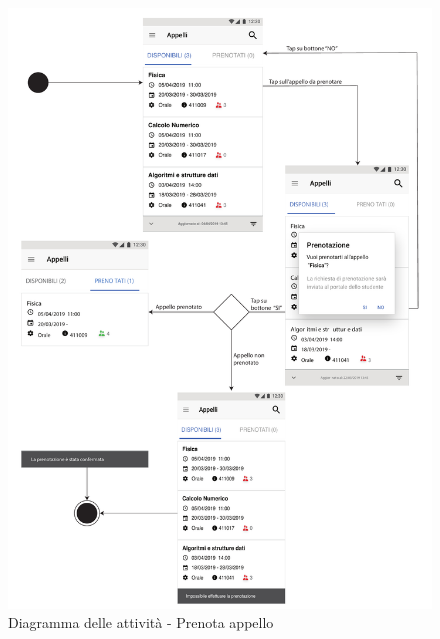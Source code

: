 \begin{figure}
	\centering
	\includegraphics[width=6in]{imgs/gruppo1/activity_diagrams/AD11_prenota_apppello.pdf}
	\caption{Diagramma delle attività - Prenota appello}
	\label{diag:prenotaAppelloAD}
\end{figure}
\newpage

